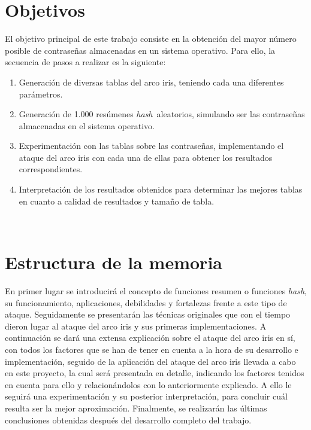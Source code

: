\documentclass[12pt,spanish,listoffigures,listoftables]{tfgetsinf}
\newcommand{\hash}{\textit{hash}}
\begin{document}
\section{Objetivos}

El objetivo principal de este trabajo consiste en la obtención del mayor número posible de contraseñas almacenadas en un sistema operativo. Para ello, la secuencia de pasos a realizar es la siguiente:

\begin{enumerate}

    \item Generación de diversas tablas del arco iris, teniendo cada una diferentes parámetros.
    
    \item Generación de 1.000 resúmenes \hash~aleatorios, simulando ser las contraseñas almacenadas en el sistema operativo.
    
    \item Experimentación con las tablas sobre las contraseñas, implementando el ataque del arco iris con cada una de ellas para obtener los resultados correspondientes.
    
    \item Interpretación de los resultados obtenidos para determinar las mejores tablas en cuanto a calidad de resultados y tamaño de tabla.
    
\end{enumerate}
~\\

\section{Estructura de la memoria}

En primer lugar se introducirá el concepto de funciones resumen o funciones \hash, su funcionamiento, aplicaciones, debilidades y fortalezas frente a este tipo de ataque. Seguidamente se presentarán las técnicas originales que con el tiempo dieron lugar al ataque del arco iris y sus primeras implementaciones. A continuación se dará una extensa explicación sobre el ataque del arco iris en sí, con todos los factores que se han de tener en cuenta a la hora de su desarrollo e implementación, seguido de la aplicación del ataque del arco iris llevada a cabo en este proyecto, la cual será presentada en detalle, indicando los factores tenidos en cuenta para ello y relacionándolos con lo anteriormente explicado. A ello le seguirá una experimentación y su posterior interpretación, para concluir cuál resulta ser la mejor aproximación. Finalmente, se realizarán las últimas conclusiones obtenidas después del desarrollo completo del trabajo.
\end{document}

